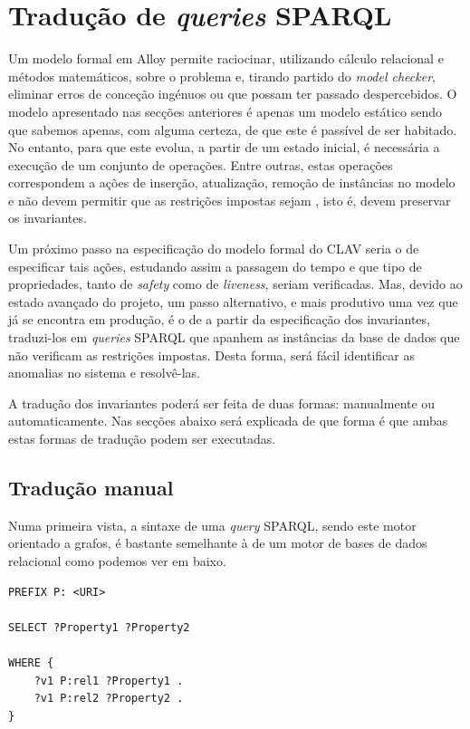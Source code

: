 \documentclass[tikz,runningheads,a4paper]{llncs}
\begin{document}
\section{Tradução de \textit{queries} SPARQL}
\label{SecQueries}

Um modelo formal em Alloy permite raciocinar, utilizando cálculo relacional e
métodos matemáticos, sobre o problema e, tirando partido do \textit{model
checker}, eliminar erros de conceção ingénuos ou que possam ter passado
despercebidos. O modelo apresentado nas secções anteriores é apenas um modelo
estático sendo que sabemos apenas, com alguma certeza, de que este é passível de
ser habitado. No entanto, para que este evolua, a partir de um estado inicial,
é necessária a execução de um conjunto de operações. Entre outras, estas operações correspondem a
ações de inserção, atualização, remoção de instâncias no modelo e não devem
permitir que as restrições impostas sejam , isto é, devem preservar os invariantes.

Um próximo passo na especificação do modelo formal do CLAV seria o de
especificar tais ações, estudando assim a passagem do tempo e que tipo de
propriedades, tanto de \textit{safety} como de \textit{liveness}, seriam
verificadas. Mas, devido ao estado avançado do projeto, um passo alternativo, e mais produtivo uma vez que já se encontra em produção, é o de
a partir da especificação dos invariantes, traduzi-los em \textit{queries}
SPARQL que apanhem as instâncias da base de dados que não verificam as
restrições impostas. Desta forma, será fácil identificar as anomalias no sistema
e resolvê-las.

A tradução dos invariantes poderá ser feita de duas formas: manualmente ou
automaticamente. Nas secções abaixo será explicada de que forma é que ambas
estas formas de tradução podem ser executadas.

\subsection{Tradução manual}

Numa primeira vista, a sintaxe de uma \textit{query} SPARQL, sendo este motor
orientado a grafos, é bastante semelhante à de um motor de bases de dados
relacional como podemos ver em baixo.

\begin{lstlisting}[language=sparql, frame=single, basicstyle=\scriptsize]
PREFIX P: <URI>

SELECT ?Property1 ?Property2

WHERE {
    ?v1 P:rel1 ?Property1 .
    ?v1 P:rel2 ?Property2 .
}
\end{lstlisting}
\end{document}

